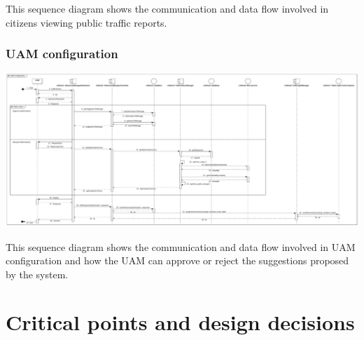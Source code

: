 \documentclass[12pt, a4paper, twoside, openright]{report}
\begin{document}
This sequence diagram shows the communication and data flow involved in
citizens viewing public traffic reports.


\subsubsection{UAM configuration}

\includegraphics[width=\linewidth]{images/svg/uam_configuration.pdf}

This sequence diagram shows the communication and data flow involved in
UAM configuration and how the UAM can approve or reject the suggestions proposed by the system.

\section{Critical points and design decisions}

\end{document}
